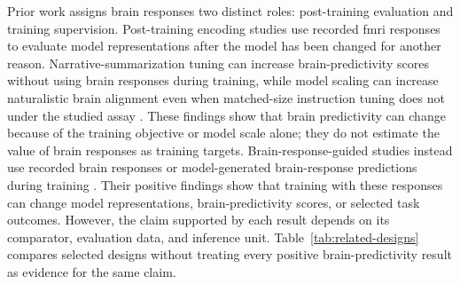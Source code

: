 Prior work assigns brain responses two distinct roles: post-training evaluation and training supervision.
Post-training encoding studies use recorded \ac{fmri} responses to evaluate model representations after the model has been changed for another reason.
Narrative-summarization tuning can increase brain-predictivity scores without using brain responses during training, while model scaling can increase naturalistic brain alignment even when matched-size instruction tuning does not under the studied assay \autocite{aw2023,gao2024}.
These findings show that brain predictivity can change because of the training objective or model scale alone; they do not estimate the value of brain responses as training targets.
Brain-response-guided studies instead use recorded brain responses or model-generated brain-response predictions during training \autocite{moussa2025,negi2025,merlinData2026,vaidya2026}.
Their positive findings show that training with these responses can change model representations, brain-predictivity scores, or selected task outcomes.
However, the claim supported by each result depends on its comparator, evaluation data, and inference unit.
Table~\ref{tab:related-designs} compares selected designs without treating every positive brain-predictivity result as evidence for the same claim.

